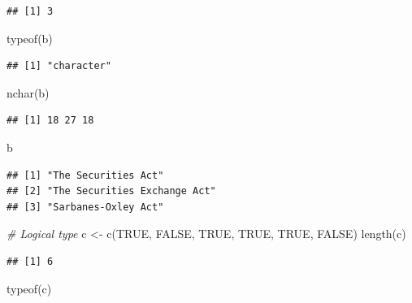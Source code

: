 \documentclass[
]{book}
\newenvironment{Shaded}{\begin{snugshade}}{\end{snugshade}}
\newcommand{\CommentTok}[1]{\textcolor[rgb]{0.56,0.35,0.01}{\textit{#1}}}
\newcommand{\ConstantTok}[1]{\textcolor[rgb]{0.00,0.00,0.00}{#1}}
\newcommand{\FunctionTok}[1]{\textcolor[rgb]{0.00,0.00,0.00}{#1}}
\newcommand{\NormalTok}[1]{#1}
\newcommand{\OtherTok}[1]{\textcolor[rgb]{0.56,0.35,0.01}{#1}}
\begin{document}
\begin{verbatim}
## [1] 3
\end{verbatim}

\begin{Shaded}
\begin{Highlighting}[]
\FunctionTok{typeof}\NormalTok{(b)}
\end{Highlighting}
\end{Shaded}

\begin{verbatim}
## [1] "character"
\end{verbatim}

\begin{Shaded}
\begin{Highlighting}[]
\FunctionTok{nchar}\NormalTok{(b)}
\end{Highlighting}
\end{Shaded}

\begin{verbatim}
## [1] 18 27 18
\end{verbatim}

\begin{Shaded}
\begin{Highlighting}[]
\NormalTok{b}
\end{Highlighting}
\end{Shaded}

\begin{verbatim}
## [1] "The Securities Act"         
## [2] "The Securities Exchange Act"
## [3] "Sarbanes-Oxley Act"
\end{verbatim}

\begin{Shaded}
\begin{Highlighting}[]
\CommentTok{\# Logical type }
\NormalTok{c }\OtherTok{\textless{}{-}} \FunctionTok{c}\NormalTok{(}\ConstantTok{TRUE}\NormalTok{, }\ConstantTok{FALSE}\NormalTok{, }\ConstantTok{TRUE}\NormalTok{, }\ConstantTok{TRUE}\NormalTok{, }\ConstantTok{TRUE}\NormalTok{, }\ConstantTok{FALSE}\NormalTok{)}
\FunctionTok{length}\NormalTok{(c)}
\end{Highlighting}
\end{Shaded}

\begin{verbatim}
## [1] 6
\end{verbatim}

\begin{Shaded}
\begin{Highlighting}[]
\FunctionTok{typeof}\NormalTok{(c)}
\end{Highlighting}
\end{Shaded}
\end{document}

